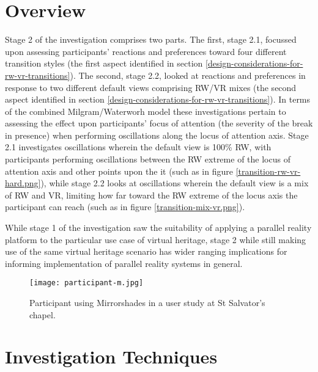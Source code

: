 
\section{Overview}

Stage 2 of the investigation comprises two parts. The first, stage 2.1, focussed upon assessing participants' reactions and preferences toward four different transition styles (the first aspect identified in section \ref{design-considerations-for-rw-vr-transitions}). The second, stage 2.2, looked at reactions and preferences in response to two different default views comprising RW/VR mixes (the second aspect identified in section \ref{design-considerations-for-rw-vr-transitions}). In terms of the combined Milgram/Waterworh model these investigations pertain to assessing the effect upon participants' focus of attention (the severity of the break in presence) when performing oscillations along the locus of attention axis. Stage 2.1 investigates oscillations wherein the default view is 100\% RW, with participants performing oscillations between the RW extreme of the locus of attention axis and other points upon the it (such as in figure \ref{transition-rw-vr-hard.png}), while stage 2.2 looks at oscillations wherein the default view is a mix of RW and VR, limiting how far toward the RW extreme of the locus axis the participant can reach (such as in figure \ref{transition-mix-vr.png}).

While stage 1 of the investigation saw the suitability of applying a parallel reality platform to the particular use case of virtual heritage, stage 2 while still making use of the same virtual heritage scenario has wider ranging implications for informing implementation of parallel reality systems in general.

\begin{figure}[ht]
	\begin{center}
		\texttt{[image: participant-m.jpg]}
		\caption{Participant using Mirrorshades in a user study at St Salvator's chapel.}
		\label{participant-m.jpg}
	\end{center}
\end{figure}


\section{Investigation Techniques}

